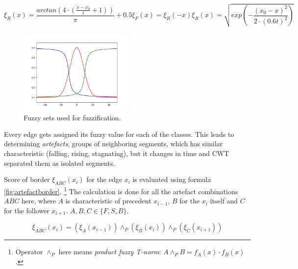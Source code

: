 \begin{subequations}
\begin{equation}
\xi_R(x) = \frac{ arctan( 4\cdot (\frac{x - x_0}{t} + 1) )}{\pi} + 0.5
\end{equation}
\begin{equation}
\xi_F(x) = \xi_R(-x)
\end{equation}
\begin{equation}
\xi_R(x) = \sqrt{ exp( -\frac{(x_0 - x)^2}{2\cdot (0.6t)^2} ) }
\end{equation}
\end{subequations}


\begin{figure}[h!]
\begin{center}
\includegraphics[width=0.5\textwidth]{render/fuzzysets.png}
\caption{Fuzzy sets used for fuzzification.\label{fig:fuzzysets}}
\end{center}
\end{figure}

Every edge gets assigned its fuzzy value for each of the classes. This leads to determining {\it artefacts},
groups of neighboring segments, which has similar characteristic (falling, rising, stagnating), but it
changes in time and CWT separated them as isolated segments.

Score of border $\xi_{ABC}(x_i)$ for the edge $x_i$ is evaluated using formula \ref{fig:artefactborder}.
\footnote{Operator $\land_P$ here means {\it product fuzzy T-norm}: $A \land_P B = f_A(x)\cdot f_B(x)$.}
The calculation is done for all the artefact combinations $ABC$ here, where $A$ is characteristic of 
precedent $x_{i-1}$, $B$ for the $x_i$ itself and $C$ for the follower $x_{i+1}$. $A,B,C \in \{F,S,B\}$.

\begin{equation}
\xi_{ABC}(x_i) = (\xi_{A}(x_{i-1})) \land_P (\xi_{B}(x_i)) \land_P (\xi_{C}(x_{i+1}))
\label{fig:artefactborder}
\end{equation}

